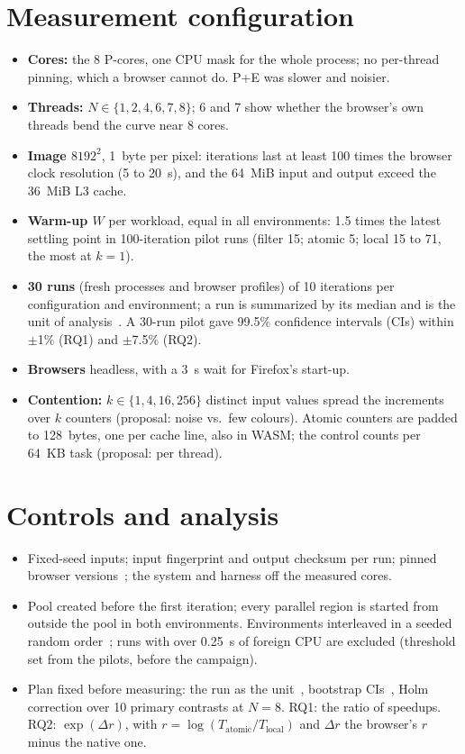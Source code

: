 \documentclass[sigplan]{acmart}
\begin{document}
\section{Measurement configuration}

\begin{itemize}[nosep,leftmargin=*]
  \item \textbf{Cores:} the 8 P-cores, one CPU mask for the whole process;
  no per-thread pinning, which a browser cannot do. P+E was slower and
  noisier.
  \item \textbf{Threads:} $N \in \{1,2,4,6,7,8\}$; 6 and 7 show whether the
  browser's own threads bend the curve near 8 cores.
  \item \textbf{Image $8192^2$}, 1~byte per pixel: iterations last at least
  100 times the browser clock resolution (5 to 20~\textmu s), and the
  64~MiB input and output exceed the 36~MiB L3 cache.
  \item \textbf{Warm-up $W$} per workload, equal in all environments: 1.5
  times the latest settling point in 100-iteration pilot runs (filter 15;
  atomic 5; local 15 to 71, the most at $k=1$).
  \item \textbf{30 runs} (fresh processes and browser profiles) of 10
  iterations per configuration and environment; a run is summarized by its
  median and is the unit of analysis~\cite{kalibera2013}. A 30-run pilot gave 99.5\% confidence intervals (CIs) within
  $\pm$1\% (RQ1) and $\pm$7.5\% (RQ2).
  \item \textbf{Browsers} headless, with a 3~s wait for Firefox's start-up.
  \item \textbf{Contention:} $k \in \{1,4,16,256\}$ distinct input values
  spread the increments over $k$ counters (proposal: noise vs.\ few
  colours). Atomic counters are padded to 128~bytes, one per cache line,
  also in WASM; the control counts per 64~KB task (proposal: per thread).
\end{itemize}

\section{Controls and analysis}

\begin{itemize}[nosep,leftmargin=*]
  \item Fixed-seed inputs; input fingerprint and output checksum per run;
  pinned browser versions~\cite{yan2021}; the system and harness off the
  measured cores.
  \item Pool created before the first iteration; every parallel region is
  started from outside the pool in both environments.
  Environments interleaved in a seeded random order~\cite{mytkowicz2009};
  runs with over 0.25~s of foreign CPU are excluded (threshold set from
  the pilots, before the campaign).
  \item Plan fixed before measuring: the run as the
  unit~\cite{georges2007}, bootstrap CIs~\cite{hoefler2015}, Holm
  correction over 10 primary contrasts at $N=8$. RQ1: the ratio of
  speedups. RQ2: $\exp(\Delta r)$, with $r=\log(T_\text{atomic}/
  T_\text{local})$ and $\Delta r$ the browser's $r$ minus the native one.
\end{itemize}
\end{document}
